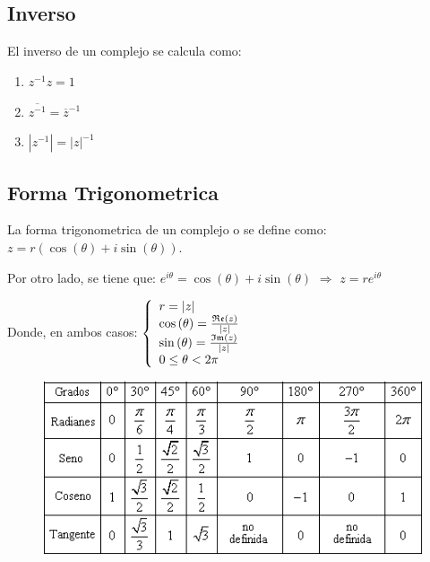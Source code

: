 \documentclass[10pt]{article}
\begin{document}
\begin{center}
\subsection{Inverso} 
\end{center}

El inverso de un complejo se calcula como: 

\begin{prop}
\begin{enumerate}
\item $z^{-1} z = 1$
\item $\overline{z^{-1}} = \overline{z}^{-1}  $
\item $|z^{-1}|= |z|^{-1}$
\end{enumerate}
\end{prop}

\begin{center}
 \subsection{Forma Trigonometrica}
\end{center}

La forma trigonometrica de un complejo o  se define como: $z = r (\cos{(\theta)} + i \sin{(\theta)})$.

Por otro lado, se tiene que: $e^{i\theta} = \cos{(\theta)} + i \sin{(\theta)}$ $\Rightarrow$ $z = r e^{i \theta}$

Donde, en ambos casos: $\left\lbrace \begin{array}{l}
r = |z| \\
\cos{(\theta)} = \frac{\mathfrak{Re}(z)}{|z|}\\
\sin{(\theta)} = \frac{\mathfrak{Im}(z)}{|z|} \\
0 \leq \theta < 2 \pi
\end{array}\right. $ 
\begin{figure}[h]
\centering
\includegraphics[scale=0.6]{figuras/tablatrig.png}
\end{figure}
\end{document}
